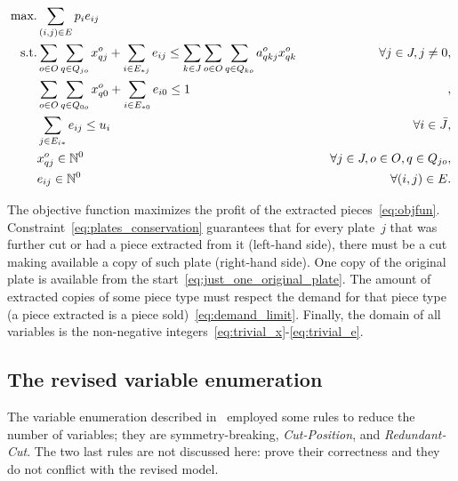 \documentclass[smallextended]{svjour3}       %
\begin{document}
\begin{align}
\mbox{max.} &\sum_{(i, j) \in E} p_i e_{ij} \label{eq:objfun}\\
\mbox{s.t.} &\sum_{o \in O}\sum_{q \in Q_{jo}} x^o_{qj} + \sum_{i \in E_{*j}} e_{ij} \leq \sum_{k \in J}\sum_{o \in O}\sum_{q \in Q_{ko}} a^o_{qkj} x^o_{qk} \hspace*{0.05\textwidth} & \forall j \in J, j \neq 0,\label{eq:plates_conservation}\\
	& \sum_{o \in O}\sum_{q \in Q_{0o}} x^o_{q0} + \sum_{i \in E_{*0}} e_{i0} \leq 1 &,\label{eq:just_one_original_plate}\\
	& \sum_{j \in E_{i*}} e_{ij} \leq u_i & \forall i \in \bar{J},\label{eq:demand_limit}\\
	& x^o_{qj} \in \mathbb{N}^0 & \forall j \in J, o \in O, q \in Q_{jo},\label{eq:trivial_x}\\
	& e_{ij} \in \mathbb{N}^0 & \forall (i, j) \in E.\label{eq:trivial_e}
\end{align}

The objective function maximizes the profit of the extracted pieces~\eqref{eq:objfun}.
Constraint~\eqref{eq:plates_conservation} guarantees that for every plate~\(j\) that was further cut or had a piece extracted from it (left-hand side), there must be a cut making available a copy of such plate (right-hand side).
One copy of the original plate is available from the start~\eqref{eq:just_one_original_plate}.
The amount of extracted copies of some piece type must respect the demand for that piece type (a piece extracted is a piece sold)~\eqref{eq:demand_limit}.
Finally, the domain of all variables is the non-negative integers~\eqref{eq:trivial_x}-\eqref{eq:trivial_e}.

\subsection{The revised variable enumeration}

The variable enumeration described in~\cite{furini:2016} employed some rules to reduce the number of variables; they are symmetry-breaking, \emph{Cut-Position}, and \emph{Redundant-Cut}.
The two last rules are not discussed here: \cite{furini:2016} prove their correctness and they do not conflict with the revised model.
\end{document}
